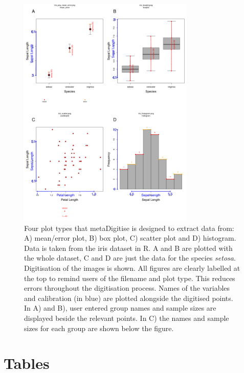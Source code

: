 \documentclass[12pt]{article}
\newcommand{\pkg}[1]{{\fontseries{b}\selectfont #1}}
\begin{document}
\begin{figure}[!h]
\centering 
 \includegraphics[width=0.75\textwidth]{fig_all_extract.pdf} 
 \caption{Four plot types that \pkg{metaDigitise} is designed to extract data from: A) mean/error plot, B) box plot, C) scatter plot and D) histogram. Data is taken from the iris dataset in R. A and B are plotted with the whole dataset, C and D are just the data for the species \textit{setosa}. Digitisation of the images is shown. All figures are clearly labelled at the top to remind users of the filename and plot type. This reduces errors throughout the digitisation process. Names of the variables and calibration (in blue) are plotted alongside the digitised points. In A) and B), user entered group names and sample sizes are displayed beside the relevant points. In C) the names and sample sizes for each group are shown below the figure.}
\label{fig:all_extract}
\end{figure}

\clearpage

\section*{Tables}
\end{document}
